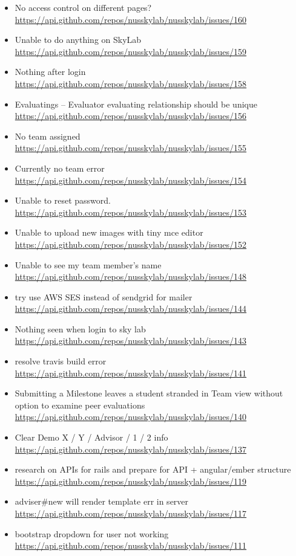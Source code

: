 {\begin{itemize}[noitemsep]
    \item No access control on different pages? \url{https://api.github.com/repos/nusskylab/nusskylab/issues/160} 
    \item Unable to do anything on SkyLab \url{https://api.github.com/repos/nusskylab/nusskylab/issues/159} 
    \item Nothing after login \url{https://api.github.com/repos/nusskylab/nusskylab/issues/158} 
    \item Evaluatings -- Evaluator evaluating relationship should be unique \url{https://api.github.com/repos/nusskylab/nusskylab/issues/156} 
    \item No team assigned \url{https://api.github.com/repos/nusskylab/nusskylab/issues/155} 
    \item Currently no team error \url{https://api.github.com/repos/nusskylab/nusskylab/issues/154} 
    \item Unable to reset password. \url{https://api.github.com/repos/nusskylab/nusskylab/issues/153} 
    \item Unable to upload new images with tiny mce editor  \url{https://api.github.com/repos/nusskylab/nusskylab/issues/152} 
    \item Unable to see my team member's name \url{https://api.github.com/repos/nusskylab/nusskylab/issues/148} 
    \item try use AWS SES instead of sendgrid for mailer \url{https://api.github.com/repos/nusskylab/nusskylab/issues/144} 
    \item Nothing seen when login to sky lab \url{https://api.github.com/repos/nusskylab/nusskylab/issues/143} 
    \item resolve travis build error \url{https://api.github.com/repos/nusskylab/nusskylab/issues/141} 
    \item Submitting a Milestone leaves a student stranded in Team view without option to examine peer evaluations \url{https://api.github.com/repos/nusskylab/nusskylab/issues/140} 
    \item Clear Demo X / Y / Advisor / 1 / 2 info  \url{https://api.github.com/repos/nusskylab/nusskylab/issues/137} 
    \item research on APIs for rails and prepare for API + angular/ember structure \url{https://api.github.com/repos/nusskylab/nusskylab/issues/119} 
    \item adviser\#new will render template err in server \url{https://api.github.com/repos/nusskylab/nusskylab/issues/117} 
    \item bootstrap dropdown for user not working \url{https://api.github.com/repos/nusskylab/nusskylab/issues/111} 

\end{itemize}}
